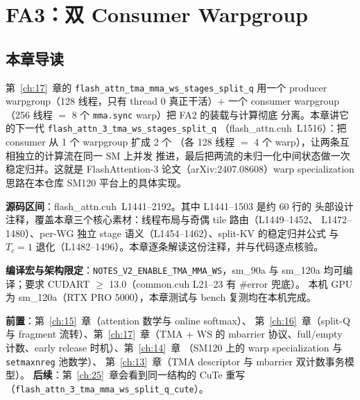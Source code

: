 \chapter{FA3：双 Consumer Warpgroup}\label{ch:18}

\section{本章导读}

第~\ref{ch:17}~章的 \texttt{flash\_\allowbreak{}attn\_\allowbreak{}tma\_\allowbreak{}mma\_\allowbreak{}ws\_\allowbreak{}stages\_\allowbreak{}split\_\allowbreak{}q} 用一个
producer warpgroup（128 线程，只有 thread 0 真正干活）$+$ 一个 consumer
warpgroup（256 线程 $=$ 8 个 \texttt{mma.sync} warp）把 FA2 的装载与计算彻底
分离。本章讲它的下一代 \texttt{flash\_\allowbreak{}attn\_\allowbreak{}3\_\allowbreak{}tma\_\allowbreak{}ws\_\allowbreak{}stages\_\allowbreak{}split\_\allowbreak{}q}
（flash\_attn.cuh~L1516）：把 consumer 从 1 个 warpgroup 扩成 2 个
（各 128 线程 $=$ 4 个 warp），让两条互相独立的计算流在同一 SM 上并发
推进，最后把两流的未归一化中间状态做一次稳定归并。这就是
FlashAttention-3 论文（arXiv:2407.08608）warp specialization 思路在本仓库
SM120 平台上的具体实现。

\textbf{源码区间}：flash\_attn.cuh~L1441--2192。其中 L1441--1503 是约 60 行的
头部设计注释，覆盖本章三个核心素材：线程布局与奇偶 tile 路由（L1449--1452、
L1472--1480）、per-WG 独立 stage 语义（L1454--1462）、split-KV 的稳定归并公式
与 $T_c{=}1$ 退化（L1482--1496）。本章逐条解读这份注释，并与代码逐点核验。

\textbf{编译宏与架构限定}：\texttt{NOTES\_\allowbreak{}V2\_\allowbreak{}ENABLE\_\allowbreak{}TMA\_\allowbreak{}MMA\_\allowbreak{}WS}，sm\_90a 与
sm\_120a 均可编译；要求 CUDART $\ge$ 13.0（common.cuh L21--23 有 \#error 兜底）。
本机 GPU 为 sm\_120a（RTX PRO 5000），本章测试与 bench 复测均在本机完成。

\textbf{前置}：第~\ref{ch:15}~章（attention 数学与 online softmax）、
第~\ref{ch:16}~章（split-Q 与 fragment 流转）、第~\ref{ch:17}~章（TMA + WS 的
mbarrier 协议、full/empty 计数、early release 时机）、第~\ref{ch:14}~章
（SM120 上的 warp specialization 与 \texttt{setmaxnreg} 池数学）、
第~\ref{ch:13}~章（TMA descriptor 与 mbarrier 双计数事务模型）。
\textbf{后续}：第~\ref{ch:25}~章会看到同一结构的 CuTe 重写
（\texttt{flash\_\allowbreak{}attn\_\allowbreak{}3\_\allowbreak{}tma\_\allowbreak{}mma\_\allowbreak{}ws\_\allowbreak{}split\_\allowbreak{}q\_\allowbreak{}cute}）。

